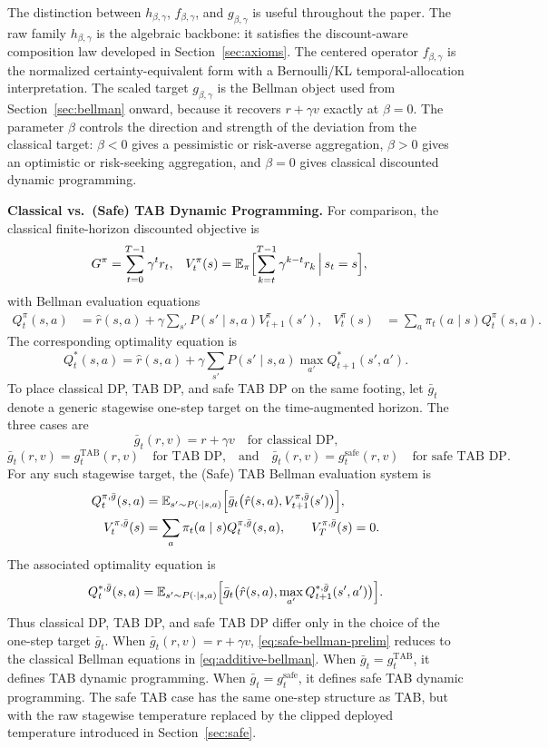 \documentclass{article}
\theoremstyle{remark}
\newcommand{\E}{\mathbb{E}}
\newcommand{\safe}{\mathrm{safe}}
\begin{document}
The distinction between $h_{\beta,\gamma}$, $f_{\beta,\gamma}$, and $g_{\beta,\gamma}$ is useful throughout the paper. The raw family $h_{\beta,\gamma}$ is the algebraic backbone: it satisfies the discount-aware composition law developed in Section~\ref{sec:axioms}. The centered operator $f_{\beta,\gamma}$ is the normalized certainty-equivalent form with a Bernoulli/KL temporal-allocation interpretation. The scaled target $g_{\beta,\gamma}$ is the Bellman object used from Section~\ref{sec:bellman} onward, because it recovers $r+\gamma v$ exactly at $\beta=0$. The parameter $\beta$ controls the direction and strength of the deviation from the classical target: $\beta<0$ gives a pessimistic or risk-averse aggregation, $\beta>0$ gives an optimistic or risk-seeking aggregation, and $\beta=0$ gives classical discounted dynamic programming.

\medskip
\noindent\textbf{Classical vs.\ (Safe) TAB Dynamic Programming.}
For comparison, the classical finite-horizon discounted objective is
\begin{align}
G^\pi &= \sum_{t=0}^{T-1} \gamma^t r_t,
&
V^\pi_t(s) &= \E_\pi\Bigl[\sum_{k=t}^{T-1}\gamma^{k-t}r_k\,\Big|\, s_t=s\Bigr],
\label{eq:additive-return}
\end{align}
with Bellman evaluation equations
\begin{align}
Q^\pi_t(s,a)
&=
\hat r(s,a)
+
\gamma \sum_{s'}P(s'\mid s,a)V^\pi_{t+1}(s'),
&
V^\pi_t(s)
&=
\sum_a \pi_t(a\mid s)Q^\pi_t(s,a).
\label{eq:additive-bellman}
\end{align}
The corresponding optimality equation is
\[
Q^*_t(s,a)
=
\hat r(s,a)
+
\gamma\sum_{s'}P(s'\mid s,a)\max_{a'}Q^*_{t+1}(s',a').
\]
To place classical DP, TAB DP, and safe TAB DP on the same footing, let $\bar g_t$ denote a generic stagewise one-step target on the time-augmented horizon. The three cases are
\[
\bar g_t(r,v)=r+\gamma v
\quad\text{for classical DP,}
\]
\[
\bar g_t(r,v)=g_t^{\mathrm{TAB}}(r,v)
\quad\text{for TAB DP,}\quad
\text{and}\quad 
\bar g_t(r,v)=g_t^{\safe}(r,v)
\quad\text{for safe TAB DP.}
\]
For any such stagewise target, the (Safe) TAB Bellman evaluation system is
\begin{align}
Q^{\pi,\bar g}_{t}(s,a)
&=
\E_{s'\sim P(\cdot\mid s,a)}
\Bigl[
\bar g_t\bigl(\hat r(s,a),V^{\pi,\bar g}_{t+1}(s')\bigr)
\Bigr],
\nonumber\\
V^{\pi,\bar g}_{t}(s)
&=
\sum_a \pi_t(a\mid s)Q^{\pi,\bar g}_{t}(s,a),
\qquad
V^{\pi,\bar g}_{T}(s)=0.
\label{eq:safe-bellman-prelim}
\end{align}
The associated optimality equation is
\[
Q^{*,\bar g}_{t}(s,a)
=
\E_{s'\sim P(\cdot\mid s,a)}
\Bigl[
\bar g_t\bigl(\hat r(s,a),\max_{a'}Q^{*,\bar g}_{t+1}(s',a')\bigr)
\Bigr].
\]
Thus classical DP, TAB DP, and safe TAB DP differ only in the choice of the one-step target $\bar g_t$. When $\bar g_t(r,v)=r+\gamma v$, \eqref{eq:safe-bellman-prelim} reduces to the classical Bellman equations in \eqref{eq:additive-bellman}. When $\bar g_t=g_t^{\mathrm{TAB}}$, it defines TAB dynamic programming. When $\bar g_t=g_t^{\safe}$, it defines safe TAB dynamic programming. The safe TAB case has the same one-step structure as TAB, but with the raw stagewise temperature replaced by the clipped deployed temperature introduced in Section~\ref{sec:safe}.
\end{document}

